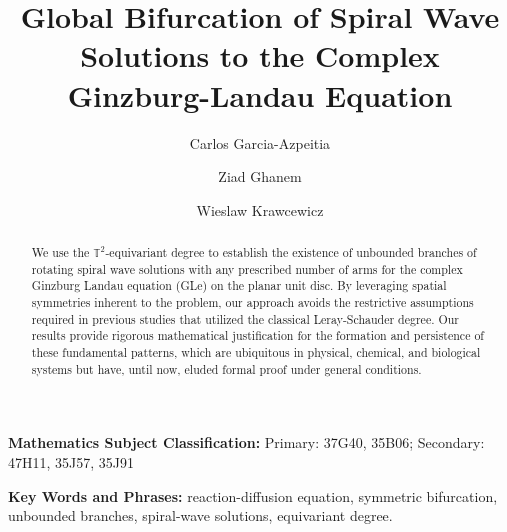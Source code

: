 \documentclass[11pt]{amsart}
\def\bt{{\mathbb{T}}}
\def\noi{\noindent}
\begin{document}
\title[Global Bifurcation of Spiral Wave Solutions]{Global Bifurcation of Spiral Wave Solutions to the Complex Ginzburg-Landau Equation} 


\author{Carlos Garcia-Azpeitia}\address{Departamento de Matem\'aticas y Mec\'anica, IIMAS-UNAM, Apdo. Postal 20-126, Col. San \'Angel,
Mexico City, 01000,  Mexico}

\author{ Ziad Ghanem}\address{Department of Mathematical Sciences, University of Texas at Dallas, Richardson, TX 75080, USA}

\author{Wieslaw Krawcewicz}\address{Department of Mathematical Sciences, University of Texas at Dallas, Richardson, TX 75080, USA}


\date{}

\maketitle

\begin{abstract}
We use the $\mathbb T^2$-equivariant degree to establish the existence of unbounded branches of rotating spiral wave solutions with any prescribed number of arms for the complex Ginzburg Landau equation (GLe) on the planar unit disc. By leveraging spatial symmetries inherent to the problem, our approach avoids the restrictive assumptions required in previous studies \cite{Dai} that utilized the classical Leray-Schauder degree. Our results provide rigorous mathematical justification for the formation and persistence of these fundamental patterns, which are ubiquitous in physical, chemical, and biological systems but have, until now, eluded formal proof under general conditions.
\end{abstract}


\noi \textbf{Mathematics Subject Classification:} Primary: 37G40, 35B06; Secondary: 47H11, 35J57,  35J91

\medskip

\noi \textbf{Key Words and Phrases:} reaction-diffusion equation, symmetric bifurcation, unbounded branches,  spiral-wave solutions, equivariant degree.
\end{document}
